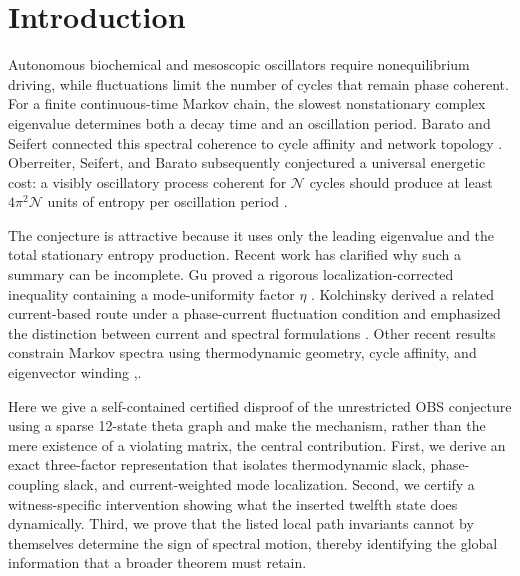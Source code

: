 \documentclass[aps,pre,reprint,groupedaddress,nofootinbib,showkeys,floatfix]{revtex4-2}
\newcommand{\Ncoh}{\mathcal N}
\begin{document}
\maketitle

\section{Introduction}
Autonomous biochemical and mesoscopic oscillators require nonequilibrium driving, while fluctuations limit the number of cycles that remain phase coherent. For a finite continuous-time Markov chain, the slowest nonstationary complex eigenvalue determines both a decay time and an oscillation period. Barato and Seifert connected this spectral coherence to cycle affinity and network topology \cite{BaratoSeifert2017}. Oberreiter, Seifert, and Barato subsequently conjectured a universal energetic cost: a visibly oscillatory process coherent for $\Ncoh$ cycles should produce at least $4\pi^2\Ncoh$ units of entropy per oscillation period \cite{OBS2022}.

The conjecture is attractive because it uses only the leading eigenvalue and the total stationary entropy production. Recent work has clarified why such a summary can be incomplete. Gu proved a rigorous localization-corrected inequality containing a mode-uniformity factor $\eta$ \cite{Gu2026}. Kolchinsky derived a related current-based route under a phase-current fluctuation condition and emphasized the distinction between current and spectral formulations \cite{Kolchinsky2026}. Other recent results constrain Markov spectra using thermodynamic geometry, cycle affinity, and eigenvector winding \cite{XuEtAl2025},\cite{KolchinskyOhgaIto2026}.

Here we give a self-contained certified disproof of the unrestricted OBS conjecture using a sparse 12-state theta graph and make the mechanism, rather than the mere existence of a violating matrix, the central contribution. First, we derive an exact three-factor representation that isolates thermodynamic slack, phase-coupling slack, and current-weighted mode localization. Second, we certify a witness-specific intervention showing what the inserted twelfth state does dynamically. Third, we prove that the listed local path invariants cannot by themselves determine the sign of spectral motion, thereby identifying the global information that a broader theorem must retain.
\end{document}
